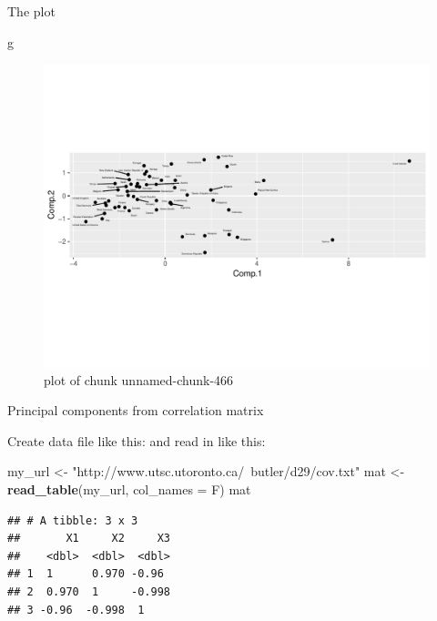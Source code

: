 \documentclass[ignorenonframetext,]{beamer}
\newenvironment{Shaded}{\begin{snugshade}}{\end{snugshade}}
\newcommand{\DataTypeTok}[1]{\textcolor[rgb]{0.13,0.29,0.53}{#1}}
\newcommand{\KeywordTok}[1]{\textcolor[rgb]{0.13,0.29,0.53}{\textbf{#1}}}
\newcommand{\NormalTok}[1]{#1}
\newcommand{\StringTok}[1]{\textcolor[rgb]{0.31,0.60,0.02}{#1}}
\begin{document}
\begin{frame}[fragile]{The plot}
\protect\hypertarget{the-plot-10}{}

\begin{Shaded}
\begin{Highlighting}[]
\NormalTok{g}
\end{Highlighting}
\end{Shaded}

\begin{figure}
\centering
\includegraphics{figure/unnamed-chunk-466-1.pdf}
\caption{plot of chunk unnamed-chunk-466}
\end{figure}

\end{frame}

\begin{frame}[fragile]{Principal components from correlation matrix}
\protect\hypertarget{principal-components-from-correlation-matrix}{}

Create data file like this:  and read in like
this:

\begin{Shaded}
\begin{Highlighting}[]
\NormalTok{my_url <-}\StringTok{ "http://www.utsc.utoronto.ca/~butler/d29/cov.txt"}
\NormalTok{mat <-}\StringTok{ }\KeywordTok{read_table}\NormalTok{(my_url, }\DataTypeTok{col_names =}\NormalTok{ F)}
\NormalTok{mat}
\end{Highlighting}
\end{Shaded}

\begin{verbatim}
## # A tibble: 3 x 3
##       X1     X2     X3
##    <dbl>  <dbl>  <dbl>
## 1  1      0.970 -0.96 
## 2  0.970  1     -0.998
## 3 -0.96  -0.998  1
\end{verbatim}

\end{frame}
\end{document}
